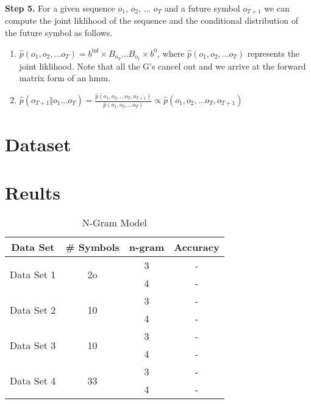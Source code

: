 \documentclass{article} %
\begin{document}
\textbf{Step 5.} For a given sequence $o_1$, $o_2$, ... $o_T$ and a future symbol $o_{T+1}$ we can compute the joint liklihood of the sequence and the conditional distribution of the future symbol as follows.
\begin{enumerate}
\item $\hat{p}(o_1, o_2, ... o_T) = b^{\inf} \times B_{o_{T}} . . . B_{o_{1}} \times b^{0}$, 
\newline where $\hat{p}(o_1, o_2, ... o_T)$ represents the joint liklihood. Note that all the G's cancel out and we arrive at the forward matrix form of an hmm.

\item $\hat{p}(o_{T+1} \Vert o_{1}...o_{T} ) = \frac{\hat{p}(o_1, o_2, ... o_T, o_{T+1})}{\hat{p}(o_1, o_2, ... o_T)} \propto \hat{p}(o_1, o_2, ... o_T, o_{T+1})$ 

\end{enumerate}

\section{Dataset}
\section{Reults}

\begin{table}[H]
\caption{N-Gram Model}
\label{N-Gram_model}
\begin{center}
\begin{tabular}{ |c|c|c|c| }
\hline
\multicolumn{1}{|c|}{\bf Data Set} &\multicolumn{1}{|c|}{\bf \# Symbols} &\multicolumn{1}{|c|}{\bf n-gram} &\multicolumn{1}{|c|}{\bf Accuracy}\\
\hline
\multirow{2}{*}{Data Set 1}& \multirow{2}{*}{2o} & 3 & - \\
& & 4 & - \\
\hline
\multirow{2}{*}{Data Set 2}& \multirow{2}{*}{10} & 3 & - \\
& & 4 & - \\
\hline
\multirow{2}{*}{Data Set 3}& \multirow{2}{*}{10} & 3 & - \\
& & 4 & - \\
\hline
\multirow{2}{*}{Data Set 4}& \multirow{2}{*}{33} & 3 & - \\
& & 4 & - \\
\hline
\end{tabular}
\end{center}
\end{table}
\end{document}
